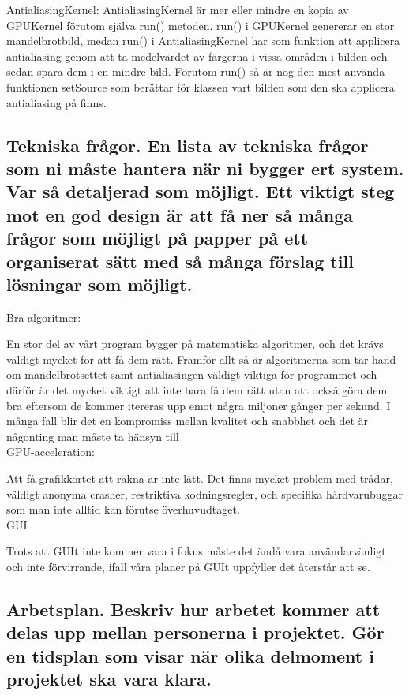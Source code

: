 \documentclass[11pt]{article} %
\begin{document}
AntialiasingKernel: AntialiasingKernel är mer eller mindre en kopia av GPUKernel förutom själva run() metoden. run() i GPUKernel genererar en stor mandelbrotbild, medan run() i AntialiasingKernel har som funktion att applicera antialiasing genom att ta medelvärdet av färgerna i vissa områden i bilden och sedan spara dem i en mindre bild. Förutom run() så är nog den mest använda funktionen setSource som berättar för klassen vart bilden som den ska applicera antialiasing på finns. \\

\subsection{Tekniska frågor. En lista av tekniska frågor som ni måste hantera när ni bygger ert system. Var så detaljerad som möjligt. Ett viktigt steg mot en god design är att få ner så många frågor som möjligt på papper på ett organiserat sätt med så många förslag till lösningar som möjligt.}

Bra algoritmer:

En stor del av vårt program bygger på matematiska algoritmer, och det krävs väldigt mycket för att få dem rätt. Framför allt så är algoritmerna som tar hand om mandelbrotsettet samt antialiasingen väldigt viktiga för programmet och därför är det mycket viktigt att inte bara få dem rätt utan att också göra dem bra eftersom de kommer itereras upp emot några miljoner gånger per sekund. I många fall blir det en kompromiss mellan kvalitet och snabbhet och det är någonting man måste ta hänsyn till \\

GPU-acceleration:

Att få grafikkortet att räkna är inte lätt. Det finns mycket problem med trådar, väldigt anonyma crasher, restriktiva kodningsregler, och specifika hårdvarubuggar som man inte alltid kan förutse överhuvudtaget.
\\

GUI

Trots att GUIt inte kommer vara i fokus måste det ändå vara användarvänligt och inte förvirrande, ifall våra planer på GUIt uppfyller det återstår att se.


\subsection{Arbetsplan. Beskriv hur arbetet kommer att delas upp mellan personerna i projektet. Gör en tidsplan som visar när olika delmoment i projektet ska vara klara.}
\end{document}
